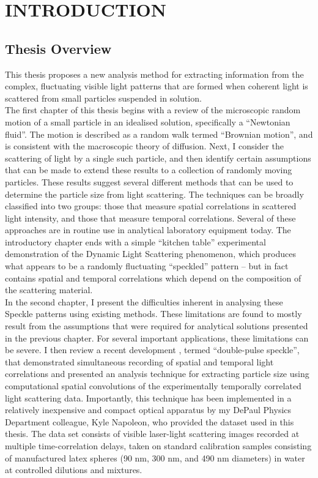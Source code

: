 \addchapheadtotoc
\setlength\parindent{0pt}

\chapter{INTRODUCTION}

\section{Thesis Overview}

This thesis proposes a new analysis method for extracting information from the complex, fluctuating visible light patterns that are formed when coherent light is scattered from small particles suspended in solution.  \\

The first chapter of this thesis begins with a review of the microscopic random motion of a small particle in an idealised solution, specifically a ``Newtonian fluid”. The motion is described as a random walk termed “Brownian motion”, and is consistent with the macroscopic theory of diffusion. Next, I consider the scattering of light by a single such particle, and then identify certain assumptions that can be made to extend these results to a collection of randomly moving particles. These results suggest several different methods that can be used to determine the particle size from light scattering.  The techniques can be broadly classified into two groups: those that measure spatial correlations in scattered light intensity, and those that measure temporal correlations. Several of these approaches are in routine use in analytical laboratory equipment today. The introductory chapter ends with a simple ``kitchen table” experimental demonstration of the Dynamic Light Scattering phenomenon, which produces what appears to be a randomly fluctuating “speckled” pattern -- but in fact contains spatial and temporal correlations which depend on the composition of the scattering material.\\

In the second chapter, I present the difficulties inherent in analysing these Speckle patterns using existing methods. These limitations are found to mostly result from the assumptions that were required for analytical solutions presented in the previous chapter.  For several important applications, these limitations can be severe. I then review a recent development \citep{LeeS}, termed “double-pulse speckle”, that demonstrated simultaneous recording of spatial and temporal light correlations and presented an analysis technique for extracting particle size using computational spatial convolutions of the experimentally temporally correlated light scattering data.  Importantly, this technique has been implemented in a relatively inexpensive and compact optical apparatus by my DePaul Physics Department colleague, Kyle Napoleon, who provided the dataset used in this thesis. The data set consists of visible laser-light scattering images recorded at multiple time-correlation delays, taken on standard calibration samples consisting of manufactured latex spheres (90 nm, 300 nm, and 490 nm diameters) in water at controlled dilutions and mixtures.\\

